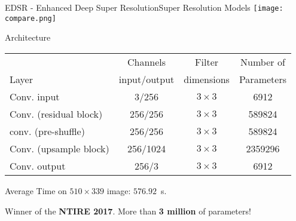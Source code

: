 \documentclass{standalone}
\begin{document}
\begin{frame}{EDSR - Enhanced Deep Super Resolution}{Super Resolution Models}
  \centering
  \texttt{[image: compare.png]}


  \begin{alertblock}{Architecture}
    \scriptsize{
    \begin{tabular}{lccc}
      \hline \rowcolor{orange!20!white}
                               &  Channels     & Filter     & Number of    \\
      \rowcolor{orange!20!white}
      Layer                    & input/output  & dimensions & Parameters   \\
      \hline
      Conv. input              & 3/256      & $3\times3$   & 6912          \\
      Conv. (residual block)   & 256/256    & $3\times3$   & 589824        \\
      conv. (pre-shuffle)      & 256/256    & $3\times3$   & 589824        \\
      Conv. (upsample block)   & 256/1024   & $3\times3$   & 2359296       \\
      Conv. output             & 256/3      & $3\times3$   & 6912          \\
      \hline
    \end{tabular}
    }

    \vspace{0.5cm}
    \scriptsize{Average Time on $510\times339$ image: $576.92$~s.}

    \scriptsize{Winner of the \textbf{NTIRE 2017}. More than \textbf{3 million} of parameters!}
  \end{alertblock}

\end{frame}
\end{document}
